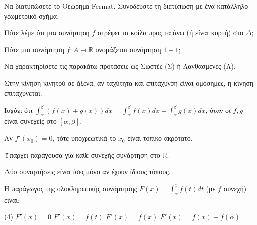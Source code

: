 \documentclass[11pt,a4paper]{article}
\newcommand{\kerkissans}[1]{{\fontfamily{maksf}\selectfont \textbf{#1}}}
\renewcommand{\textdexiakeraia}{}
\newcommand{\dint}{\displaystyle\int}
\newcommand\themanum{A}
\newcounter{thema}[section]
\renewcommand{\thethema}{\arabic{thema}}
\newcommand{\Thema}{\refstepcounter{thema}{\textbf{\textcolor{black}{\faPenSquare\ \  \large \kerkissans{\textbf{\thethemaο\hspace{2mm}Διαγώνισμα - Θέμα \themanum}}}}}\hspace{0mm}}{}
\newenvironment{thema}[1]
{\begin{tcolorbox}[title=\Thema\kerkissans{\textbf{\large{  #1}}},breakable,
enhanced standard,titlerule=0pt,toprule=0pt, rightrule=0pt, bottomrule=0pt,
colback=white,left=0mm,top=1mm,bottom=0mm,
boxrule=0pt,
colframe=white,leftrule=0mm,sharp corners,coltitle=black]
\renewcommand{\themanum}{#1}}
{\end{tcolorbox}}
\begin{document}
\begin{thema}{A}
\begin{erwthma}
    \item Να διατυπώσετε το Θεώρημα Fermat. Συνοδεύστε τη διατύπωση με ένα κατάλληλο γεωμετρικό σχήμα.
    \item Πότε λέμε ότι μια συνάρτηση $f$ στρέφει τα κοίλα προς τα άνω (ή είναι κυρτή) στο $\Delta$;
    \item Πότε μια συνάρτηση $f:A\to\mathbb{R}$ ονομάζεται συνάρτηση $1-1$;
    \item Να χαρακτηρίσετε τις παρακάτω προτάσεις ως Σωστές (Σ) ή Λανθασμένες (Λ).
    \begin{alist}
        \item Στην κίνηση κινητού σε άξονα, αν ταχύτητα και επιτάχυνση είναι ομόσημες, η κίνηση επιταχύνεται.
        \item Ισχύει ότι $\dint_{\alpha}^{\beta} (f(x) + g(x)) dx = \dint_{\alpha}^{\beta} f(x) dx + \dint_{\alpha}^{\beta} g(x) dx$, όταν οι $f, g$ είναι συνεχείς στο $[\alpha, \beta]$.
        \item Αν $f'(x_0) = 0$, τότε υποχρεωτικά το $x_0$ είναι τοπικό ακρότατο.
        \item Υπάρχει παράγουσα για κάθε συνεχής συνάρτηση στο $\mathbb{R}$.
        \item Δύο συναρτήσεις είναι ίσες μόνο αν έχουν ίδιους τύπους.
    \end{alist}
    \item Η παράγωγος της ολοκληρωτικής συνάρτησης $F(x) = \dint_\alpha^x f(t) dt$ (με $f$ συνεχή) είναι:
    \begin{tasks}[label=\let\textdexiakeraia\relax\alph*.](4)
        \task $F'(x) = 0$
        \task $F'(x) = f(t)$
        \task $F'(x) = f(x)$
        \task $F'(x) = f(x) - f(\alpha)$
    \end{tasks}
\end{erwthma}
\end{thema}
\vspace{1cm}
\end{document}

